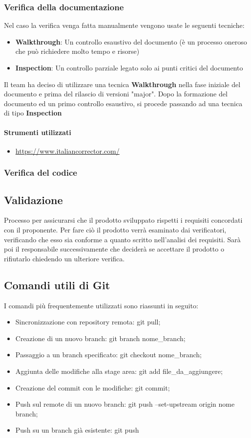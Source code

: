 \documentclass[12pt]{article}
\begin{document}
\subsubsection{Verifica della documentazione}
Nel caso la verifica venga fatta manualmente vengono usate le seguenti tecniche:
\begin{itemize}
    \item \textbf{Walkthrough}: Un controllo esaustivo del documento (è un processo oneroso che può richiedere molto tempo e risorse)
    \item \textbf{Inspection}: Un controllo parziale legato solo ai punti critici del documento
\end{itemize}
Il team ha deciso di utilizzare una tecnica \textbf{Walkthrough} nella fase iniziale del documento e prima del rilascio di versioni "major".
Dopo la formazione del documento ed un primo controllo esaustivo, si procede passando ad una tecnica di tipo \textbf{Inspection}
\paragraph{Strumenti utilizzati}
\begin{itemize}
    \item \url{https://www.italiancorrector.com/}
\end{itemize}
\subsubsection{Verifica del codice}

\subsection{Validazione}
Processo per assicurarsi che il prodotto sviluppato rispetti i requisiti concordati con il proponente.
Per fare ciò il prodotto verrà esaminato dai verificatori, verificando che esso sia conforme a quanto scritto nell'analisi dei requisiti. Sarà poi il responsabile successivamente che deciderà se accettare il prodotto o rifiutarlo chiedendo un ulteriore verifica.
\subsection{Comandi utili di Git}
I comandi più frequentemente utilizzati sono riassunti in seguito:
\begin{itemize}
    \item Sincronizzazione con repository remota: git pull;
    \item Creazione di un nuovo branch: git branch nome\_branch;
    \item Passaggio a un branch specificato: git checkout nome\_branch;
    \item Aggiunta delle modifiche alla stage area: git add file\_da\_aggiungere;
    \item Creazione del commit con le modifiche: git commit;
    \item Push sul remote di un nuovo branch: git push --set-upstream origin nome branch;
    \item Push su un branch già esistente: git push
\end{itemize}
\end{document}
